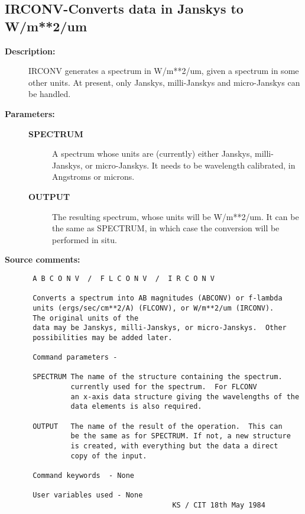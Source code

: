 \subsection{IRCONV-\label{IRCONV}Converts data in Janskys to W/m**2/um}
\begin{description}

\item [{\bf Description:}]
 IRCONV generates a spectrum in W/m**2/um, given a spectrum
 in some other units.  At present, only Janskys, milli-Janskys and
 micro-Janskys can be handled.

\item [{\bf Parameters:}]
\begin{description}
\item [{\bf SPECTRUM}]
 A spectrum whose units are (currently) either Janskys,
 milli-Janskys, or micro-Janskys.  It needs to be
 wavelength calibrated, in Angstroms or microns.
\item [{\bf OUTPUT}]
 The resulting spectrum, whose units will be
 W/m**2/um. It can be the same as SPECTRUM, in which
 case the conversion will be performed in situ.
\end{description}

\item [{\bf Source comments:}]
\begin{verbatim}
 A B C O N V  /  F L C O N V  /  I R C O N V

 Converts a spectrum into AB magnitudes (ABCONV) or f-lambda
 units (ergs/sec/cm**2/A) (FLCONV), or W/m**2/um (IRCONV).
 The original units of the
 data may be Janskys, milli-Janskys, or micro-Janskys.  Other
 possibilities may be added later.

 Command parameters -

 SPECTRUM The name of the structure containing the spectrum.
          currently used for the spectrum.  For FLCONV
          an x-axis data structure giving the wavelengths of the
          data elements is also required.

 OUTPUT   The name of the result of the operation.  This can
          be the same as for SPECTRUM. If not, a new structure
          is created, with everything but the data a direct
          copy of the input.

 Command keywords  - None

 User variables used - None
                                  KS / CIT 18th May 1984
\end{verbatim}
\end{description}
